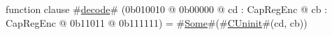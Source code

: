 function clause #\hyperref[zdecode]{decode}# (0b010010 @ 0b00000 @ cd : CapRegEnc @ cb : CapRegEnc @    0b11011 @ 0b111111) = #\hyperref[zSome]{Some}#(#\hyperref[zCUninit]{CUninit}#(cd, cb))
